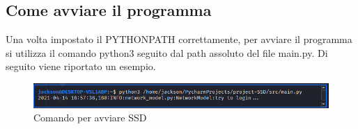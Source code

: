 \subsection{Come avviare il programma}
Una volta impostato il PYTHONPATH correttamente, per avviare il programma si utilizza il comando python3 seguito dal path assoluto del file main.py. Di seguito viene riportato un esempio.
\begin{figure}[H]
    \centering
    \includegraphics[scale = 0.50]{components/img/avvio.png}
    \caption{ Comando per avviare SSD}
    \label{fig:comando per impostare PYTHONPATH su windows}
\end{figure}
